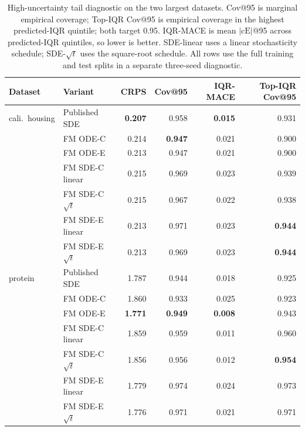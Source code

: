 \documentclass{tpm2026}
\begin{document}
\begin{table}[!h]
  \centering
  \caption{High-uncertainty tail diagnostic on the two largest datasets. Cov@95 is marginal empirical coverage; Top-IQR Cov@95 is empirical coverage in the highest predicted-IQR quintile; both target 0.95. IQR-MACE is mean $|\text{cE}|$@95 across predicted-IQR quintiles, so lower is better. SDE-linear uses a linear stochasticity schedule; SDE-$\sqrt{t}$ uses the square-root schedule. All rows use the full training and test splits in a separate three-seed diagnostic.}\label{tab:tail-diagnostic}
  \scriptsize
  \begin{tabular}{llrrrr}
    \toprule
    Dataset & Variant & CRPS & Cov@95 & IQR-MACE & Top-IQR Cov@95 \\
    \midrule
    cali.\ housing & Published SDE            & \textbf{0.207} & 0.958 & \textbf{0.015} & 0.931 \\
                   & FM ODE-C                 & 0.214 & \textbf{0.947} & 0.021 & 0.900 \\
                   & FM ODE-E                 & 0.213 & 0.947 & 0.021 & 0.900 \\
                   & FM SDE-C linear          & 0.215 & 0.969 & 0.023 & 0.939 \\
                   & FM SDE-C $\sqrt{t}$      & 0.215 & 0.967 & 0.022 & 0.938 \\
                   & FM SDE-E linear          & 0.213 & 0.971 & 0.023 & \textbf{0.944} \\
                   & FM SDE-E $\sqrt{t}$      & 0.213 & 0.969 & 0.023 & \textbf{0.944} \\
    protein        & Published SDE            & 1.787 & 0.944 & 0.018 & 0.925 \\
                   & FM ODE-C                 & 1.860 & 0.933 & 0.025 & 0.923 \\
                   & FM ODE-E                 & \textbf{1.771} & \textbf{0.949} & \textbf{0.008} & 0.943 \\
                   & FM SDE-C linear          & 1.859 & 0.959 & 0.011 & 0.960 \\
                   & FM SDE-C $\sqrt{t}$      & 1.856 & 0.956 & 0.012 & \textbf{0.954} \\
                   & FM SDE-E linear          & 1.779 & 0.974 & 0.024 & 0.973 \\
                   & FM SDE-E $\sqrt{t}$      & 1.776 & 0.971 & 0.021 & 0.971 \\
    \bottomrule
  \end{tabular}
\end{table}
\end{document}
